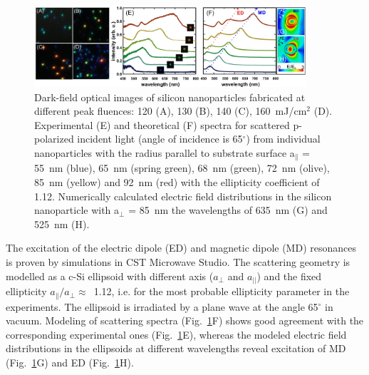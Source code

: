         \begin{figure}[h!]
                \begin{center}
                    \includegraphics[width=0.9\textwidth]{figs/results/char/DarkField.eps}
                \end{center}
                \caption{Dark-field optical images of silicon nanoparticles fabricated at different peak fluences:
                120 (A), 130 (B), 140 (C), 160~mJ/cm$^{2}$ (D). Experimental (E) and theoretical (F) spectra for
                scattered p-polarized incident light (angle of incidence is 65$^{\circ}$) from individual nanoparticles
                with the radius parallel to substrate surface a$_{\parallel}$ = 55~nm (blue), 65~nm (spring green),
                68~nm (green), 72~nm (olive), 85~nm (yellow) and 92~nm (red) with the ellipticity coefficient of 1.12.
                Numerically calculated electric field distributions in the silicon nanoparticle with a$_{\perp}$ = 85~nm
                 the wavelengths of 635~nm (G) and 525~nm (H).}
                \label{fig:Darkfield}
        \end{figure}


        The excitation of the electric dipole (ED) and magnetic dipole (MD) resonances is proven by simulations
        in CST Microwave Studio. The scattering geometry is modelled as a c-Si ellipsoid with different axis
        ($a_{\perp}$ and $a_{||}$) and the fixed ellipticity $a_{\parallel}/a_{\perp}\approx$~1.12, i.e. for
        the most probable ellipticity parameter in the experiments. The ellipsoid is irradiated by a plane wave
        at the angle 65$^{\circ}$ in vacuum. Modeling of scattering spectra (Fig.~\ref{fig:Darkfield}F) shows good agreement
        with the corresponding experimental ones (Fig.~\ref{fig:Darkfield}E), whereas the modeled electric field distributions
        in the ellipsoids at different wavelengths reveal excitation of MD (Fig.~\ref{fig:Darkfield}G) and ED (Fig.~\ref{fig:Darkfield}H).

    \subsection{}

